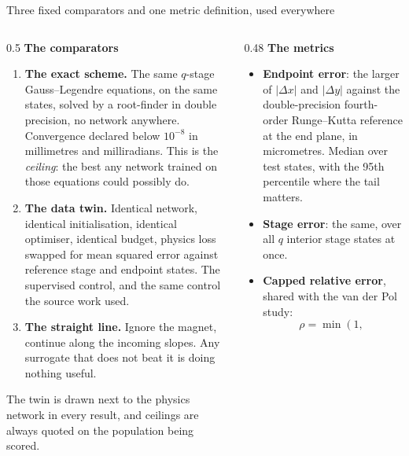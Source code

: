 \documentclass[aspectratio=169,10pt]{beamer}
\newcommand{\hl}[1]{{\color{accent}\textbf{#1}}}
\begin{document}
\begin{frame}[shrink=25]{Three fixed comparators and one metric definition, used everywhere}
  \vspace{1mm}
  \begin{columns}[T]
    \begin{column}{0.5\textwidth}
      \textbf{The comparators}
      \begin{enumerate}\small
        \item \hl{The exact scheme.} The same $q$-stage Gauss--Legendre
              equations, on the same states, solved by a root-finder in double
              precision, no network anywhere. Convergence declared below
              $10^{-8}$ in millimetres and milliradians. This is the
              \emph{ceiling}: the best any network trained on those equations
              could possibly do.
        \item \hl{The data twin.} Identical network, identical initialisation,
              identical optimiser, identical budget, physics loss swapped for
              mean squared error against reference stage and endpoint states.
              The supervised control, and the same control the source work used.
        \item \hl{The straight line.} Ignore the magnet, continue along the
              incoming slopes. Any surrogate that does not beat it is doing
              nothing useful.
      \end{enumerate}
      \smallskip
      {\small The twin is drawn next to the physics network in every result, and
       ceilings are always quoted on the population being scored.}
    \end{column}
    \begin{column}{0.48\textwidth}
      \textbf{The metrics}
      \begin{itemize}\small
        \item \textbf{Endpoint error}: the larger of $|\Delta x|$ and
              $|\Delta y|$ against the double-precision fourth-order
              Runge--Kutta reference at the end plane, in micrometres. Median
              over test states, with the 95th percentile where the tail matters.
        \item \textbf{Stage error}: the same, over all $q$ interior stage states
              at once.
        \item \textbf{Capped relative error}, shared with the van der Pol study:
              \[ \rho = \min\!\left(1,\
\]
\end{itemize}
\end{column}
\end{columns}
\end{frame}
\end{document}
